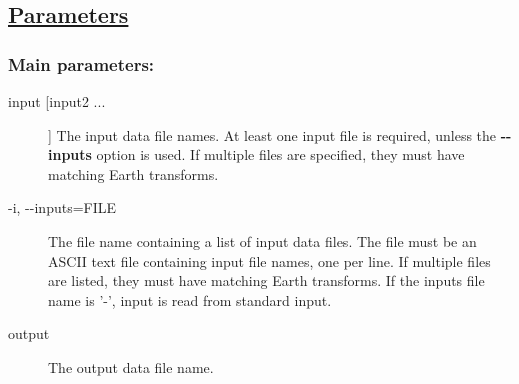 \subsection*{\underline{Parameters}}
\subsubsection*{Main parameters:}
\begin{description}
\item[ input [input2 ...] ] The input data file names. At least one input file is required, unless the \textbf{-{-}inputs}
 option is used. If multiple files are specified, they must have matching Earth transforms. 
\item[ -i, -{-}inputs=FILE ] The file name containing a list of input data files. The file must be an ASCII text file containing input file names, one per line. If multiple files are listed, they must have matching Earth transforms. If the inputs file name is '-', input is read from standard input.
\item[ output ] The output data file name. 

\end{description}
